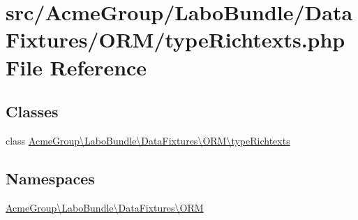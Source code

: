 \hypertarget{type_richtexts_8php}{\section{src/\+Acme\+Group/\+Labo\+Bundle/\+Data\+Fixtures/\+O\+R\+M/type\+Richtexts.php File Reference}
\label{type_richtexts_8php}
}
\subsection*{Classes}
\begin{DoxyCompactItemize}
\item 
class \hyperlink{class_acme_group_1_1_labo_bundle_1_1_data_fixtures_1_1_o_r_m_1_1type_richtexts}{Acme\+Group\textbackslash{}\+Labo\+Bundle\textbackslash{}\+Data\+Fixtures\textbackslash{}\+O\+R\+M\textbackslash{}type\+Richtexts}
\end{DoxyCompactItemize}
\subsection*{Namespaces}
\begin{DoxyCompactItemize}
\item 
 \hyperlink{namespace_acme_group_1_1_labo_bundle_1_1_data_fixtures_1_1_o_r_m}{Acme\+Group\textbackslash{}\+Labo\+Bundle\textbackslash{}\+Data\+Fixtures\textbackslash{}\+O\+R\+M}
\end{DoxyCompactItemize}
